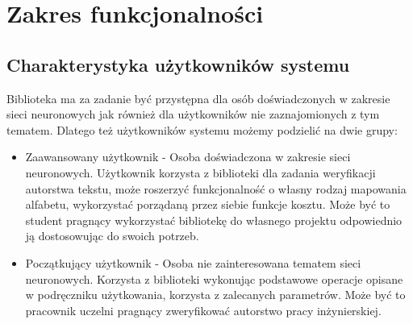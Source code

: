 \newpage
\section{Zakres funkcjonalności}

\subsection{Charakterystyka użytkowników systemu}
Biblioteka ma za zadanie być przystępna dla osób doświadczonych w zakresie sieci neuronowych jak również
dla użytkowników nie zaznajomionych z tym tematem. Dlatego też użytkowników systemu możemy podzielić 
na dwie grupy:
\begin{itemize}
 	\item Zaawansowany użytkownik - Osoba doświadczona w zakresie sieci neuronowych. Użytkownik korzysta
 	z biblioteki dla zadania weryfikacji autorstwa tekstu, może roszerzyć funkcjonalność o własny rodzaj
 	mapowania alfabetu, wykorzystać porządaną przez siebie funkcje kosztu. Może być to student pragnący
 	wykorzystać bibliotekę do własnego projektu odpowiednio ją dostosowując do swoich potrzeb.
 	\item Początkujący użytkownik - Osoba nie zainteresowana tematem sieci neuronowych. Korzysta z biblioteki
 	wykonując podstawowe operacje opisane w podręczniku użytkowania, korzysta z zalecanych parametrów.
 	Może być to pracownik uczelni pragnący zweryfikować autorstwo pracy inżynierskiej.
\end{itemize}

 
